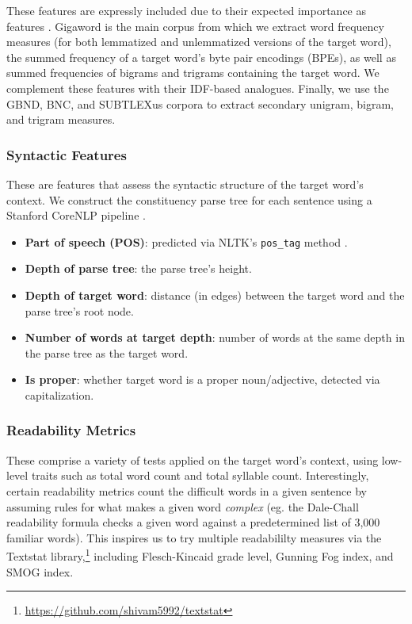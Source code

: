 \documentclass{dcthesis}
\theoremstyle{definition}
\theoremstyle{remark}
\begin{document}
These features are expressly included due to their expected importance as features \citep{zampieri2017complex}. Gigaword is the main corpus from which we extract word frequency measures (for both lemmatized and unlemmatized versions of the target word), the summed frequency of a target word's byte pair encodings (BPEs), as well as summed frequencies of bigrams and trigrams containing the target word. We complement these features with their IDF-based analogues. Finally, we use the GBND, BNC, and SUBTLEXus corpora to extract secondary unigram, bigram, and trigram measures. 

\subsubsection{Syntactic Features}

These are features that assess the syntactic structure of the target word's context. We construct the constituency parse tree for each sentence using a Stanford CoreNLP pipeline \citep{manning2014stanford}.

\begin{itemize}
  \item \textbf{Part of speech (POS)}: predicted via NLTK's \texttt{pos\_tag} method \citep{bird2009natural}.
  \item \textbf{Depth of parse tree}: the parse tree's height.
  \item \textbf{Depth of target word}: distance (in edges) between the target word and the parse tree's root node.
  \item \textbf{Number of words at target depth}: number of words at the same depth in the parse tree as the target word.
  \item \textbf{Is proper}: whether target word is a proper noun/adjective, detected via capitalization.
\end{itemize}

\subsubsection{Readability Metrics}

These comprise a variety of tests applied on the target word's context, using low-level traits such as total word count and total syllable count. Interestingly, certain readability metrics count the difficult words in a given sentence by assuming rules for what makes a given word \textit{complex} (eg. the Dale-Chall readability formula \citep{dale1948formula} checks a given word against a predetermined list of 3,000 familiar words). This inspires us to try multiple readabililty measures via the Textstat library,\footnote{\url{https://github.com/shivam5992/textstat}} including Flesch-Kincaid grade level, Gunning Fog index, and SMOG index.
\end{document}
